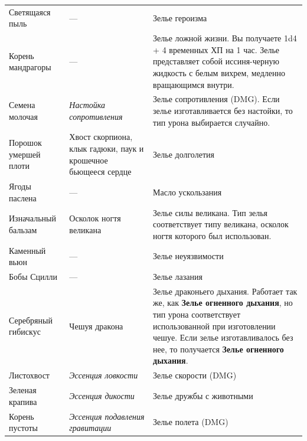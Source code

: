 \documentclass[a4paper, 9pt, twocolumn]{book}
\begin{document}
\begin{tabularx}{\linewidth}{T E X}
		Светящаяся пыль & --- & Зелье героизма \\
		
		Корень мандрагоры & --- & Зелье ложной жизни. Вы получаете 1d4 + 4 временных ХП на 1 час. Зелье представляет собой иссиня-черную жидкость с белым вихрем, медленно вращающимся внутри.\\
		
		Семена молочая & \textit{Настойка сопротивления} &  Зелье сопротивления (DMG). Если зелье изготавливается без настойки, то тип урона выбирается случайно.\\
		
		Порошок умершей плоти & Хвост скорпиона, клык гадюки, паук и крошечное бьющееся сердце & Зелье долголетия \\
		
		Ягоды паслена & --- & Масло ускользания  \\
		
		Изначальный бальзам & Осколок ногтя великана & Зелье силы великана. Тип зелья соответствует типу великана, осколок ногтя которого был использован. \\
		
		Каменный вьюн & --- & Зелье неуязвимости \\
		
		Бобы Сцилли & --- & Зелье лазания \\
		
		Серебряный гибискус & Чешуя дракона & Зелье драконьего дыхания. Работает так же, как \textbf{Зелье огненного дыхания}, но тип урона соответствует использованной при изготовлении чешуе. Если зелье изготавливалось без нее, то получается \textbf{Зелье огненного дыхания}.  \\
		
		Листохвост & \textit{Эссенция ловкости} & Зелье скорости (DMG) \\
		
		Зеленая крапива & \textit{Эссенция дикости} & Зелье дружбы с животными \\
		
		Корень пустоты & \textit{Эссенция подавления гравитации} & Зелье полета (DMG) \\
		

\end{tabularx}
\end{document}
